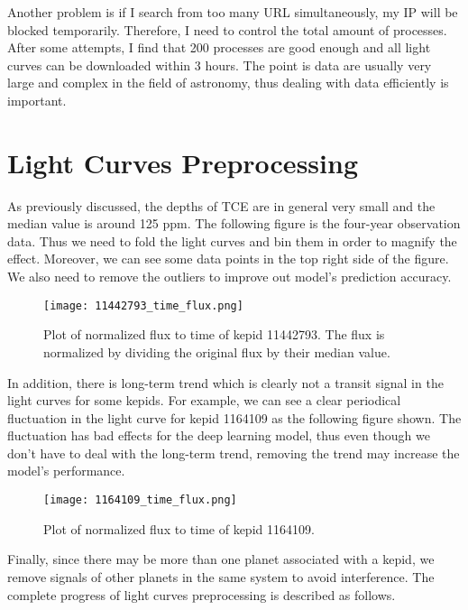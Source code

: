    Another problem is if I search from too many URL simultaneously, my IP will be blocked
    temporarily. Therefore, I need to control the total amount of processes. After some 
    attempts, I find that 200 processes are good enough and all light curves can be 
    downloaded within 3 hours. The point is data are usually very large and complex 
    in the field of astronomy, thus dealing with data efficiently is important.

    
  \section{Light Curves Preprocessing}
    As previously discussed, the depths of TCE are in general very small and the median 
    value is around 125 ppm. The following figure is the four-year observation data. 
    Thus we need to fold the light curves and bin them in order to magnify the effect.
    Moreover, we can see some data points in the top right side of the figure. We also 
    need to remove the outliers to improve out model's prediction accuracy.
    
    \begin{figure}[!htp]
      \centering
      \texttt{[image: 11442793\_time\_flux.png]}
      \caption[Plot of normalized flux to time of kepid 11442793.]
        {Plot of normalized flux to time of kepid 11442793. The flux is normalized by 
        dividing the original flux by their median value.}
      \label{fig: 11442793_time_flux}
    \end{figure}

    In addition, there is long-term trend which is clearly not a transit signal
    in the light curves for some kepids. For example, we can see a clear periodical 
    fluctuation in the light curve for kepid 1164109 as the following figure shown.
    The fluctuation has bad effects for the deep learning model, thus even though we don't 
    have to deal with the long-term trend, removing the trend may increase the model's 
    performance.

    \begin{figure}[!htp]
      \centering
      \texttt{[image: 1164109\_time\_flux.png]}
      \caption[Plot of normalized flux to time of kepid 1164109.]
        {Plot of normalized flux to time of kepid 1164109.}
      \label{fig: 1164109_time_flux}
    \end{figure}

    Finally, since there may be more than one planet associated with a kepid, we remove 
    signals of other planets in the same system to avoid interference. The complete 
    progress of light curves preprocessing is described as follows.


